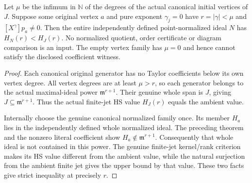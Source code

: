 \begin{theorem}
\label{hir:actual-point-low-tangent-coefficient-strict-hs-drop}
\leanok
Let $\mu$ be the infimum in $\mathbb N$ of the degrees of the actual
canonical initial vertices of $J$. Suppose some original vertex $a$
and pure exponent $\gamma_j=0$ have
$r=|\gamma|<\mu$ and $[X^\gamma]p_a\ne0$.
Then the entire independently defined point-normalized ideal $N$ has
$H_N(r)<H_J(r)$. No normalized quotient, order certificate or diagram
comparison is an input. The empty vertex family has $\mu=0$ and hence
cannot satisfy the disclosed coefficient witness.
\end{theorem}
\begin{proof}
Each canonical original generator has no Taylor coefficients below its
own vertex degree. All vertex degrees are at least $\mu>r$, so each
generator belongs to the actual maximal-ideal power $\mathfrak m^{r+1}$.
Their genuine whole span is $J$, giving $J\subseteq\mathfrak m^{r+1}$.
Thus the actual finite-jet HS value $H_J(r)$ equals the ambient value.

Internally choose the genuine canonical normalized family once. Its
member $H_a$ lies in the independently defined whole normalized ideal.
The preceding theorem and the nonzero literal coefficient show
$H_a\notin\mathfrak m^{r+1}$. Consequently that whole ideal is not
contained in this power. The genuine finite-jet kernel/rank criterion
makes its HS value different from the ambient value, while the natural
surjection from the ambient finite jet gives the upper bound by that
value. These two facts give strict inequality at precisely $r$.
\end{proof}

